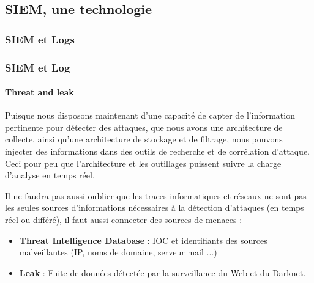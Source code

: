 

\subsection{SIEM, une technologie}

\subsubsection{SIEM et Logs}

\begin{frame}
\frametitle<presentation>{SIEM et Log}
\framesubtitle<presentation>{Threat and leak}
Puisque nous disposons maintenant d'une capacité de capter de l'information pertinente pour détecter des attaques, que nous avons une architecture de collecte,  ainsi qu'une architecture de stockage et de filtrage, nous pouvons injecter des informations dans des outils de recherche et de corrélation d'attaque.
Ceci pour peu que l'architecture et les outillages puissent suivre la charge d'analyse en temps réel.

Il ne faudra pas aussi oublier que les traces informatiques et réseaux ne sont pas les seules sources d'informations nécessaires à la détection d'attaques (en temps réel ou différé), il faut aussi connecter des sources de menaces : 
\begin{itemize}
  \item \textbf{Threat Intelligence Database }:  IOC et identifiants des sources malveillantes (IP, noms de domaine, serveur mail ...)
  \item  \textbf{Leak} : Fuite de données détectée par la surveillance du Web et du Darknet.
\end{itemize}

\end{frame}



